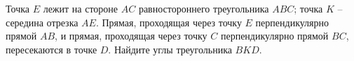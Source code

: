 \begin{ex}
	\begin{condition}
		Точка \( E  \) лежит на стороне \( AC  \) равностороннего треугольника \( ABC \); точка \( K \) – середина отрезка \( AE \). Прямая, проходящая через точку \( E  \) перпендикулярно прямой \( AB \), и прямая, проходящая через точку \( C  \) перпендикулярно прямой \( BC \), пересекаются в точке \( D \). Найдите углы треугольника \( BKD \).
	\end{condition}
\end{ex}
